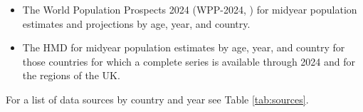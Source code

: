 \documentclass[12pt]{article}
\begin{document}
\begin{itemize}
    \item The World Population Prospects 2024 (WPP-2024, \cite{UnitedNationsDepartmentforEconomicandSocialAffairs2025}) for midyear population estimates and projections by age, year, and country.
    \item The HMD for midyear population estimates by age, year, and country for those countries for which a complete series is available through 2024 and for the regions of the UK.
\end{itemize}

%

For a list of data sources by country and year see Table \ref{tab:sources}.
\end{document}
